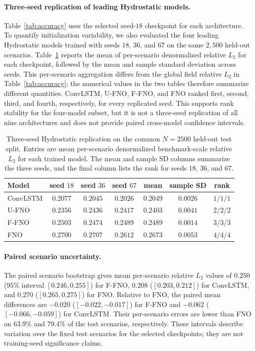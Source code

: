 \paragraph{Three-seed replication of leading Hydrostatic models.}
Table~\ref{tab:accuracy} uses the selected seed-$18$ checkpoint for each architecture. To quantify initialization variability, we also evaluated the four leading Hydrostatic models trained with seeds $18$, $36$, and $67$ on the same $2{,}500$ held-out scenarios. Table~\ref{tab:multiseed-architecture} reports the mean of per-scenario denormalized relative $L_2$ for each checkpoint, followed by the mean and sample standard deviation across seeds. This per-scenario aggregation differs from the global field relative $L_2$ in Table~\ref{tab:accuracy}; the numerical values in the two tables therefore summarize different quantities. ConvLSTM, U-FNO, F-FNO, and FNO ranked first, second, third, and fourth, respectively, for every replicated seed. This supports rank stability for the four-model subset, but it is not a three-seed replication of all nine architectures and does not provide paired cross-model confidence intervals.

\begin{table}[pos=!htbp]
\centering
\caption{Three-seed Hydrostatic replication on the common $N = 2500$ held-out test split. Entries are mean per-scenario denormalized benchmark-scale relative $L_2$ for each trained model. The mean and sample SD columns summarize the three seeds, and the final column lists the rank for seeds $18$, $36$, and $67$.}
\label{tab:multiseed-architecture}
\small
\begin{tabular}{lcccccc}
    \toprule
    Model & seed $18$ & seed $36$ & seed $67$ & mean & sample SD & rank \\
    \midrule
    ConvLSTM & $0.2077$ & $0.2045$ & $0.2026$ & $0.2049$ & $0.0026$ & $1/1/1$ \\
    U-FNO    & $0.2356$ & $0.2436$ & $0.2417$ & $0.2403$ & $0.0041$ & $2/2/2$ \\
    F-FNO    & $0.2503$ & $0.2474$ & $0.2489$ & $0.2489$ & $0.0014$ & $3/3/3$ \\
    FNO      & $0.2700$ & $0.2707$ & $0.2612$ & $0.2673$ & $0.0053$ & $4/4/4$ \\
    \bottomrule
\end{tabular}
\end{table}

\paragraph{Paired scenario uncertainty.}
The paired scenario bootstrap gives mean per-scenario relative $L_2$ values of $0.250$ ($95\%$ interval $[0.246, 0.255]$) for F-FNO, $0.208$ ($[0.203, 0.212]$) for ConvLSTM, and $0.270$ ($[0.265, 0.275]$) for FNO. Relative to FNO, the paired mean differences are $-0.020$ ($[-0.022, -0.017]$) for F-FNO and $-0.062$ ($[-0.066, -0.059]$) for ConvLSTM. Their per-scenario errors are lower than FNO on $63.9\%$ and $79.4\%$ of the test scenarios, respectively. These intervals describe variation over the fixed test scenarios for the selected checkpoints; they are not training-seed significance claims.

